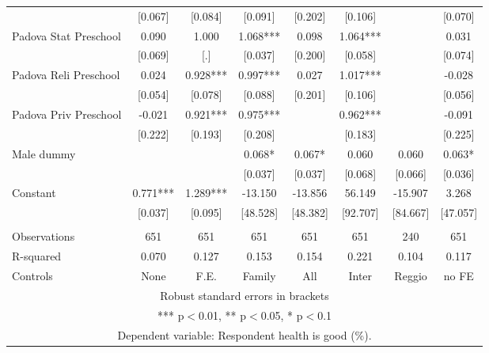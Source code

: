 \begin{tabular}{lccccccc}
 & [0.067] & [0.084] & [0.091] & [0.202] & [0.106] &  & [0.070] \\
Padova Stat Preschool & 0.090 & 1.000 & 1.068*** & 0.098 & 1.064*** &  & 0.031 \\
 & [0.069] & [.] & [0.037] & [0.200] & [0.058] &  & [0.074] \\
Padova Reli Preschool & 0.024 & 0.928*** & 0.997*** & 0.027 & 1.017*** &  & -0.028 \\
 & [0.054] & [0.078] & [0.088] & [0.201] & [0.106] &  & [0.056] \\
Padova Priv Preschool & -0.021 & 0.921*** & 0.975*** &  & 0.962*** &  & -0.091 \\
 & [0.222] & [0.193] & [0.208] &  & [0.183] &  & [0.225] \\
Male dummy &  &  & 0.068* & 0.067* & 0.060 & 0.060 & 0.063* \\
 &  &  & [0.037] & [0.037] & [0.068] & [0.066] & [0.036] \\
Constant & 0.771*** & 1.289*** & -13.150 & -13.856 & 56.149 & -15.907 & 3.268 \\
 & [0.037] & [0.095] & [48.528] & [48.382] & [92.707] & [84.667] & [47.057] \\
 &  &  &  &  &  &  &  \\
Observations & 651 & 651 & 651 & 651 & 651 & 240 & 651 \\
R-squared & 0.070 & 0.127 & 0.153 & 0.154 & 0.221 & 0.104 & 0.117 \\
 Controls & None & F.E. & Family & All & Inter & Reggio & no FE \\ \hline
\multicolumn{8}{c}{ Robust standard errors in brackets} \\
\multicolumn{8}{c}{ *** p$<$0.01, ** p$<$0.05, * p$<$0.1} \\
\multicolumn{8}{c}{ Dependent variable: Respondent health is good (\%).} \\
\end{tabular}
